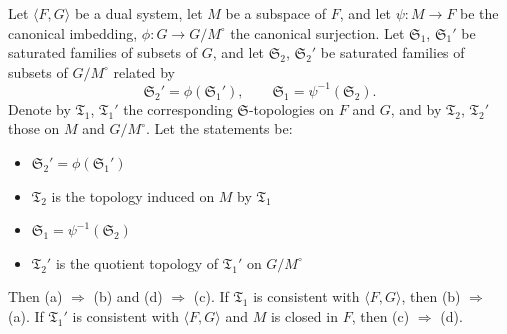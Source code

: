 Let $\langle F, G \rangle$ be a dual system, let $M$ be a subspace of $F$, and let $\psi: M \to F$ be the canonical imbedding, $\phi: G \to G/M^\circ$ the canonical surjection. Let $\mathfrak{S}_1$, $\mathfrak{S}_1'$ be saturated families of subsets of $G$, and let $\mathfrak{S}_2$, $\mathfrak{S}_2'$ be saturated families of subsets of $G/M^\circ$ related by
$$\mathfrak{S}_2' = \phi(\mathfrak{S}_1'), \qquad \mathfrak{S}_1 = \psi^{-1}(\mathfrak{S}_2).$$
Denote by $\mathfrak{T}_1$, $\mathfrak{T}_1'$ the corresponding $\mathfrak{S}$-topologies on $F$ and $G$, and by $\mathfrak{T}_2$, $\mathfrak{T}_2'$ those on $M$ and $G/M^\circ$. Let the statements be:
\begin{itemize}
\item[(a)] $\mathfrak{S}_2' = \phi(\mathfrak{S}_1')$
\item[(b)] $\mathfrak{T}_2$ is the topology induced on $M$ by $\mathfrak{T}_1$
\item[(c)] $\mathfrak{S}_1 = \psi^{-1}(\mathfrak{S}_2)$
\item[(d)] $\mathfrak{T}_2'$ is the quotient topology of $\mathfrak{T}_1'$ on $G/M^\circ$
\end{itemize}
Then (a) $\Rightarrow$ (b) and (d) $\Rightarrow$ (c). If $\mathfrak{T}_1$ is consistent with $\langle F, G \rangle$, then (b) $\Rightarrow$ (a). If $\mathfrak{T}_1'$ is consistent with $\langle F, G \rangle$ and $M$ is closed in $F$, then (c) $\Rightarrow$ (d).
